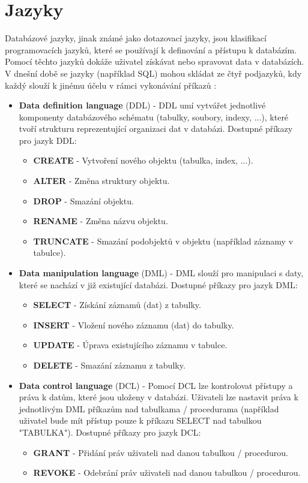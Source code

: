 \section{Jazyky} \label{sec:jazyky}
Databázové jazyky, jinak známé jako dotazovací jazyky, jsou klasifikací programovacích jazyků, které se používají k definování a přístupu k databázím. Pomocí těchto jazyků dokáže uživatel získávat nebo spravovat data v databázích. V dnešní době se jazyky (například SQL) mohou skládat ze čtyř podjazyků, kdy každý slouží k jinému účelu v rámci vykonávání příkazů \cite{indeedDBLanguage, begginersBookDBLanguage}:
\begin{itemize}
\item \textbf{Data definition language} (DDL) - DDL umí vytvářet jednotlivé komponenty databázového schématu (tabulky, soubory, indexy, ...), které tvoří strukturu reprezentující organizaci dat v databázi. Dostupné příkazy pro jazyk DDL:
	\begin{itemize}
	\item \textbf{CREATE} - Vytvoření nového objektu (tabulka, index, ...).
	\item \textbf{ALTER} - Změna struktury objektu.
	\item \textbf{DROP} - Smazání objektu.
	\item \textbf{RENAME} - Změna názvu objektu.
	\item \textbf{TRUNCATE} - Smazání podobjektů v objektu (například záznamy v tabulce).
	\end{itemize}
\item \textbf{Data manipulation language} (DML) - DML slouží pro manipulaci s daty, které se nachází v již existující databázi. Dostupné příkazy pro jazyk DML:
	\begin{itemize}
	\item \textbf{SELECT} - Získání záznamů (dat) z tabulky.
	\item \textbf{INSERT} - Vložení nového záznamu (dat) do tabulky.
	\item \textbf{UPDATE} - Úprava existujícího záznamu v tabulce.
	\item \textbf{DELETE} - Smazání záznamu z tabulky.
	\end{itemize}
\item \textbf{Data control language} (DCL) - Pomocí DCL lze kontrolovat přístupy a práva k datům, které jsou uloženy v databázi. Uživateli lze nastavit práva k jednotlivým DML příkazům nad tabulkama / procedurama (například uživatel bude mít přístup pouze k příkazu SELECT nad tabulkou "TABULKA"). Dostupné příkazy pro jazyk DCL:
	\begin{itemize}
	\item \textbf{GRANT} - Přidání práv uživateli nad danou tabulkou / procedurou. 
	\item \textbf{REVOKE} - Odebrání práv uživateli nad danou tabulkou / procedurou.
	\end{itemize}


\end{itemize}
